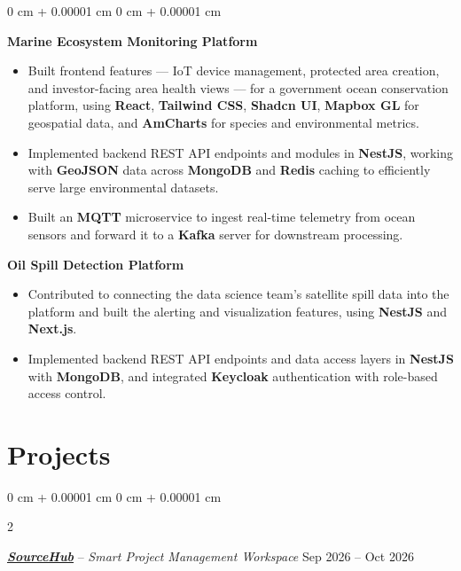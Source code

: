 \documentclass[7pt, letterpaper]{extarticle}
\newenvironment{highlights}{
    \begin{itemize}[
        topsep=0.05 cm,
        parsep=0.05 cm,
        partopsep=0pt,
        itemsep=0pt,
        leftmargin=0.6 cm
    ]
}{
    \end{itemize}
} %
\newenvironment{onecolentry}{
    \begin{adjustwidth}{
        0 cm + 0.00001 cm
    }{
        0 cm + 0.00001 cm
    }
}{
    \end{adjustwidth}
} %
\newenvironment{twocolentry}[2][]{
    \onecolentry
    \def\secondColumn{#2}
    \setcolumnwidth{\fill, 4.5 cm}
    \begin{paracol}{2}
}{
    \switchcolumn \raggedleft \secondColumn
    \end{paracol}
    \endonecolentry
} %
\let\hrefWithoutArrow\href
\begin{document}
        \begin{onecolentry}
            \hspace{0.3 cm}\textbf{Marine Ecosystem Monitoring Platform} \\
            \begin{highlights}
                \item Built frontend features — IoT device management, protected area creation, and investor-facing area health views — for a government ocean conservation platform, using \textbf{React}, \textbf{Tailwind CSS}, \textbf{Shadcn UI}, \textbf{Mapbox GL} for geospatial data, and \textbf{AmCharts} for species and environmental metrics.
                \item Implemented backend REST API endpoints and modules in \textbf{NestJS}, working with \textbf{GeoJSON} data across \textbf{MongoDB} and \textbf{Redis} caching to efficiently serve large environmental datasets.
                \item Built an \textbf{MQTT} microservice to ingest real-time telemetry from ocean sensors and forward it to a \textbf{Kafka} server for downstream processing.
            \end{highlights}

            \vspace{0.15 cm}
            \hspace{0.3 cm}\textbf{Oil Spill Detection Platform} \\
            \begin{highlights}
                \item Contributed to connecting the data science team's satellite spill data into the platform and built the alerting and visualization features, using \textbf{NestJS} and \textbf{Next.js}.
                \item Implemented backend REST API endpoints and data access layers in \textbf{NestJS} with \textbf{MongoDB}, and integrated \textbf{Keycloak} authentication with role-based access control.
            \end{highlights}
        \end{onecolentry}
        \vspace{0.20 cm}


    \section{Projects}
        \begin{twocolentry}{
            Sep 2026 – Oct 2026
        }
        \textbf{\textit{\hrefWithoutArrow{http://sourcehub.com/}{SourceHub}}} -- \textit{Smart Project Management Workspace} \end{twocolentry}
        \vspace{0.10 cm}
\end{document}
